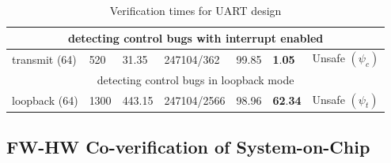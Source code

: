 \documentclass[sigconf]{acmart}
\begin{document}
\begin{table}
\begin{center}
{\begin{scriptsize}
\begin{tabular}{|l|l|l|l|l|l|l|}
\multicolumn{7}{|c|}{detecting control bugs with interrupt enabled} \\ \hline
transmit (64) & 520 & 31.35 & 247104/362 & 99.85 &
  \textbf{1}.\textbf{05} & Unsafe $(\psi_{c})$ \\ \hline
\multicolumn{7}{|c|}{detecting control bugs in loopback mode} \\ \hline
  loopback (64) & 1300 & 443.15 & 247104/2566 & 98.96 & \textbf{62}.\textbf{34}
  & Unsafe $(\psi_{t})$ \\ \hline
\end{tabular}
\end{scriptsize}
}
\end{center}
\caption{Verification times for UART design
\label{table:safe}}
\end{table}

\subsection{FW-HW Co-verification of System-on-Chip}
\end{document}
